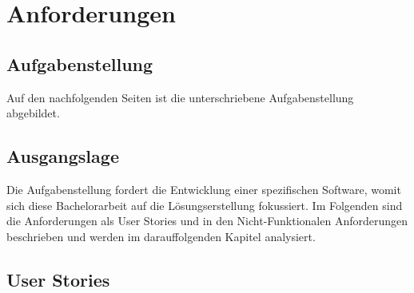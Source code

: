 \chapter{Anforderungen}

\section{Aufgabenstellung}
\label{sec:anforderung:aufgabenstellung}

Auf den nachfolgenden Seiten ist die unterschriebene Aufgabenstellung abgebildet.



\begin{comment}
Ausgangslage (Kontext) und Problembeschreibung bzw. -analyse (mit Beschreibung der
Problemtyps, also ob Fokus Lösungserstellung oder Machbarkeitsanalyse). Anforderungen spezifiziert:
Funktionale Anforderungen z.B. als Use Cases (short) oder User Stories beschrieben, alle relevanten Nichtfunktionalen Anforderungen (NFA) und Qualitätsattribute abgedeckt und überprüfbar beschrieben.
\end{comment}

\section{Ausgangslage}
Die Aufgabenstellung fordert die Entwicklung einer spezifischen Software, womit sich diese Bachelorarbeit auf die Lösungserstellung fokussiert. Im Folgenden sind die Anforderungen als User Stories und in den Nicht-Funktionalen Anforderungen beschrieben und werden im darauffolgenden Kapitel analysiert.

\section{User Stories}\label{sec:pd:user-stories}

